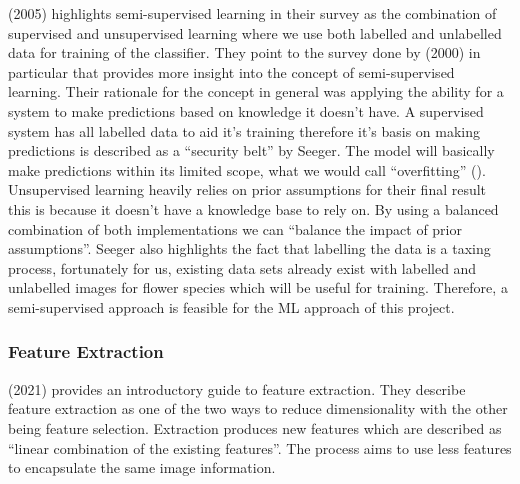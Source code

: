 \documentclass{article}
\begin{document}
\par

\citeauthor{zhu2005semi} (2005) highlights semi-supervised learning in their survey as the combination of supervised and
unsupervised 
learning where we use both labelled and unlabelled data for training of the classifier. They point to the survey done by
\citeauthor{seeger2000learning} (2000) in particular that provides more insight into the concept of semi-supervised 
learning. Their rationale for the concept in general was applying the ability for a system to make predictions based on 
knowledge it doesn't have. A supervised system has all labelled data to aid it's training therefore it's basis on making
predictions is described as a “security belt” by Seeger. The model will basically make predictions within its limited 
scope, what we would call “overfitting” (\cite{tom1995}). Unsupervised learning heavily relies on prior assumptions for 
their final result this is because it doesn't have a knowledge base to rely on. By using a balanced combination of both 
implementations we can “balance the impact of prior assumptions”. Seeger also highlights the fact that labelling the 
data is a taxing process, fortunately for us, existing data sets already exist with labelled and unlabelled images for 
flower species which will be useful for training. Therefore, a semi-supervised approach is feasible for the ML approach
of this project.

\subsubsection{Feature Extraction}

\citeauthor{dishaa2021} (2021) provides an introductory guide to feature extraction. They describe feature extraction 
as one of the two ways to reduce dimensionality with the other being feature selection. Extraction produces new 
features which are described as “linear combination of the existing features”. The process aims to use less features to 
encapsulate the same image information.

\par
\end{document}
